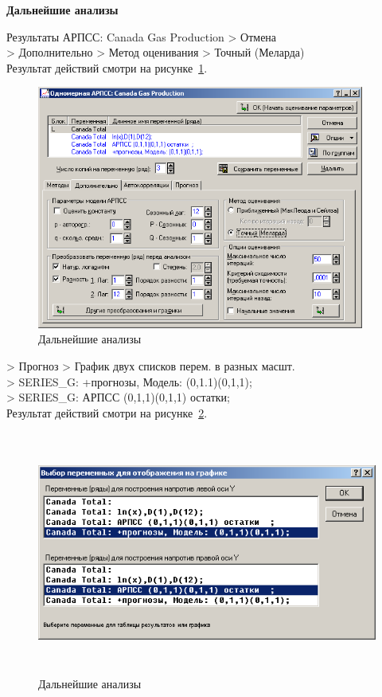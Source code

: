 \begin{center}
  \textbf{Дальнейшие анализы}
\end{center}

Результаты АРПСС: Canada Gas Production > Отмена\\
> Дополнительно > Метод оценивания > Точный (Меларда)\\

Результат действий смотри на рисунке~\ref{fig:2_21}.

\begin{figure}[!h]
  \centering

  \includegraphics[height=8cm]
  {inc/Canada_Gas_Production/21.PNG}

  \caption{Дальнейшие анализы}

  \label{fig:2_21}
\end{figure}

\newpage

> Прогноз > График двух списков перем. в разных масшт.\\
> SERIES\_G: +прогнозы, Модель: (0,1.1)(0,1,1);\\
> SERIES\_G: АРПСС (0,1,1)(0,1,1) остатки;\\

Результат действий смотри на рисунке~\ref{fig:2_22}.

\begin{figure}[!h]
  \centering

  \includegraphics[height=8cm]
  {inc/Canada_Gas_Production/22.PNG}

  \caption{Дальнейшие анализы}

  \label{fig:2_22}
\end{figure}

